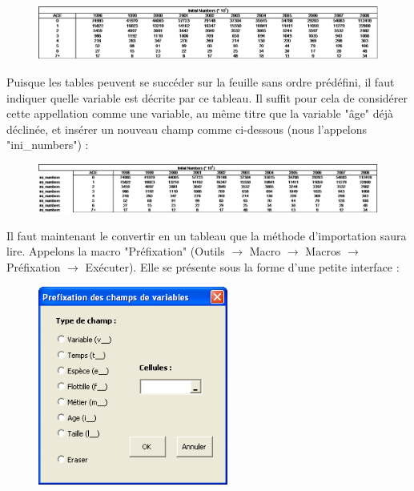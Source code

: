 \documentclass[12pt, colorinlistoftodos, notitlepage]{report}
\newenvironment{not used}[1]{%
    \longtable{%
        |>{\centering$\displaystyle}A{#1}{1}<{$}%
        |}\hline\ignorespaces}{%
    \endlongtable\ignorespacesafterend}
\begin{document}
\begin{figure}[h!]
\begin{center}
\includegraphics[width = \textwidth]{figures/param/stock1.png}
\end{center}
\label{fig:ex}
\end{figure}

Puisque les tables peuvent se succéder sur la feuille sans ordre prédéfini, il faut indiquer quelle variable est décrite par ce tableau. Il suffit pour cela de considérer cette appellation comme une variable, au même titre que la variable "âge" déjà déclinée, et insérer un nouveau champ comme ci-dessous (nous l'appelons "ini\_numbers") :

\begin{figure}[h!]
    \begin{center}
    \includegraphics[width = \textwidth]{figures/param/stock2.png}
    \end{center}
    \label{fig:ini_num}
\end{figure}

Il faut maintenant le convertir en un tableau que la méthode d'importation saura lire. Appelons la macro "Préfixation" (Outils $ \to $ Macro $ \to $ Macros $ \to $ Préfixation $ \to $ Exécuter). Elle se présente sous la forme d'une petite interface :

\begin{figure}[H]
    \begin{center}
    \includegraphics[width = 6.24cm]{figures/param/stock3.png}
    \end{center}
    \label{fig:prefix}
\end{figure}
\end{document}
